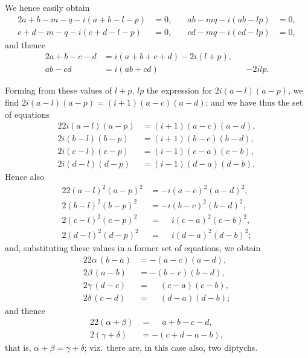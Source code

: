 \documentclass[11pt,a4paper]{book}
\begin{document}
We hence easily obtain
\begin{alignat*}{2}
a+b-m-q-i(a+b-l-p) &= 0, &\quad ab-mq-i(ab-lp) &= 0, \\
c+d-m-q-i(c+d-l-p) &= 0, &\quad cd-mq-i(cd-lp) &= 0,
\end{alignat*}
and thence
\begin{alignat*}{2}
a+b-c-d &= i(a+b+c+d) - 2i(l+p), \\
ab-cd &= i(ab+cd) &&- 2ilp.
\end{alignat*}

Forming from these values of $l+p$, $lp$ the expression for $2i(a-l)(a-p)$, we find $2i(a-l)(a-p) = (i+1)(a-c)(a-d)$; and we have thus the set of equations
\begin{alignat*}{2}
2i(a-l)(a-p) &= (i+1)(a-c)(a-d), \\
2i(b-l)(b-p) &= (i+1)(b-c)(b-d), \\
2i(c-l)(c-p) &= (i-1)(c-a)(c-b), \\
2i(d-l)(d-p) &= (i-1)(d-a)(d-b).
\end{alignat*}
Hence also
\begin{alignat*}{2}
2(a-l)^2 (a-p)^2 &= -i(a-c)^2 (a-d)^2, \\
2(b-l)^2 (b-p)^2 &= -i(b-c)^2 (b-d)^2, \\
2(c-l)^2 (c-p)^2 &= \phantom{-}i(c-a)^2 (c-b)^2, \\
2(d-l)^2 (d-p)^2 &= \phantom{-}i(d-a)^2 (d-b)^2;
\end{alignat*}
and, substituting these values in a former set of equations, we obtain
\begin{alignat*}{2}
2\alpha\, (b-a) &= -(a-c)(a-d), \\
2\beta\, (a-b) &= -(b-c)(b-d), \\
2\gamma\, (d-c) &= \phantom{-}(c-a)(c-b), \\
2\delta\, (c-d) &= \phantom{-}(d-a)(d-b);
\end{alignat*}
and thence
\begin{alignat*}{2}
2(\alpha+\beta) &= \phantom{-}a+b-c-d, \\
2(\gamma+\delta) &= -(c+d-a-b),
\end{alignat*}
that is, $\alpha+\beta = \gamma+\delta$; viz.\ there are, in this case also, two diptychs.
\end{document}
